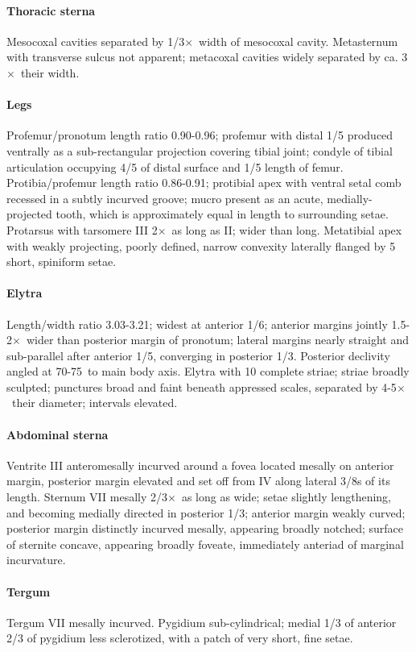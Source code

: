 \documentclass[fleqn,10pt,lineno]{wlpeerj} %
\newcommand{\td}{\textdegree~}
\newcommand{\x}{$\times$~}
\begin{document}
			\paragraph{Thoracic sterna} 
				Mesocoxal cavities separated by 1/3\x width of mesocoxal cavity. 
				Metasternum with transverse sulcus not apparent; metacoxal cavities widely separated by ca. 3\x their width.
			\paragraph{Legs}
				Profemur/pronotum length ratio 0.90-0.96; profemur with distal 1/5 produced ventrally as a sub-rectangular projection covering tibial joint; condyle of tibial articulation occupying 4/5 of distal surface and 1/5 length of femur. 
				Protibia/profemur length ratio 0.86-0.91; protibial apex with ventral setal comb recessed in a subtly incurved groove; mucro present as an acute, medially-projected tooth, which is approximately equal in length to surrounding setae. 
				Protarsus with tarsomere III 2\x as long as II; wider than long. 
				Metatibial apex with weakly projecting, poorly defined, narrow convexity laterally flanged by 5 short, spiniform setae.
			\paragraph{Elytra}
				Length/width ratio 3.03-3.21; widest at anterior 1/6; anterior margins jointly 1.5-2\x wider than posterior margin of pronotum; lateral margins nearly straight and sub-parallel after anterior 1/5, converging in posterior 1/3. 
				Posterior declivity angled at 70-75\td to main body axis. Elytra with 10 complete striae; striae broadly sculpted; punctures broad and faint beneath appressed scales, separated by 4-5\x their diameter; intervals elevated.
			\paragraph{Abdominal sterna}
				Ventrite III anteromesally incurved around a fovea located mesally on anterior margin, posterior margin elevated and set off from IV along lateral 3/8s of its length. 
				Sternum VII mesally 2/3\x as long as wide; setae slightly lengthening, and becoming medially directed in posterior 1/3; anterior margin weakly curved; posterior margin distinctly incurved mesally, appearing broadly notched; surface of sternite concave, appearing broadly foveate, immediately anteriad of marginal incurvature.
			\paragraph{Tergum}
				Tergum VII mesally incurved.
				Pygidium sub-cylindrical; medial 1/3 of anterior 2/3 of pygidium less sclerotized, with a patch of very short, fine setae.
\end{document}
